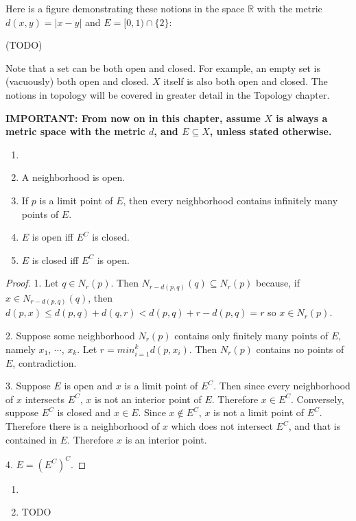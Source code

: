     Here is a figure demonstrating these notions in the space $\mathbb{R}$ with the metric $d(x,y) = |x-y|$ and $E = [0,1) \cap \{2\}$:
    
    (TODO)
    
    Note that a set can be both open and closed. For example, an empty set is (vacuously) both open and closed. $X$ itself is also both open and closed. The notions in topology will be covered in greater detail in the Topology chapter.
    
    \textbf{IMPORTANT: From now on in this chapter, assume $X$ is always a metric space with the metric $d$, and $E \subseteq X$, unless stated otherwise.}
    
    \begin{prop} \label{prop_analysis_top} \begin{enumerate} \item[]
        \item A neighborhood is open.
        \item If $p$ is a limit point of $E$, then every neighborhood contains infinitely many points of $E$.
        \item $E$ is open iff $E^C$ is closed.
        \item $E$ is closed iff $E^C$ is open.
    \end{enumerate} \end{prop}
    
    \begin{proof}
    1. Let $q \in N_r(p)$. Then $N_{r-d(p,q)}(q) \subseteq N_r(p)$ because, if $x \in N_{r-d(p,q)}(q)$, then $d(p,x) \leq d(p,q)+d(q,r) < d(p,q)+r-d(p,q) = r$ so $x \in N_r(p)$.
    
    2. Suppose some neighborhood $N_r(p)$ contains only finitely many points of $E$, namely $x_1$, $\cdots$, $x_k$. Let $r=min_{i=1}^k d(p,x_i)$. Then $N_r(p)$ contains no points of $E$, contradiction.
    
    3. Suppose $E$ is open and $x$ is a limit point of $E^C$. Then since every neighborhood of $x$ intersects $E^C$, $x$ is not an interior point of $E$. Therefore $x \in E^C$. Conversely, suppose $E^C$ is closed and $x \in E$. Since $x \notin E^C$, $x$ is not a limit point of $E^C$. Therefore there is a neighborhood of $x$ which does not intersect $E^C$, and that is contained in $E$. Therefore $x$ is an interior point. 
    
    4. $E = (E^C)^C$.
    \end{proof}
    
    \begin{prop} \label{prop_analysis_closure} \begin{enumerate} \item[]
        \item TODO
    \end{enumerate} \end{prop}
    

